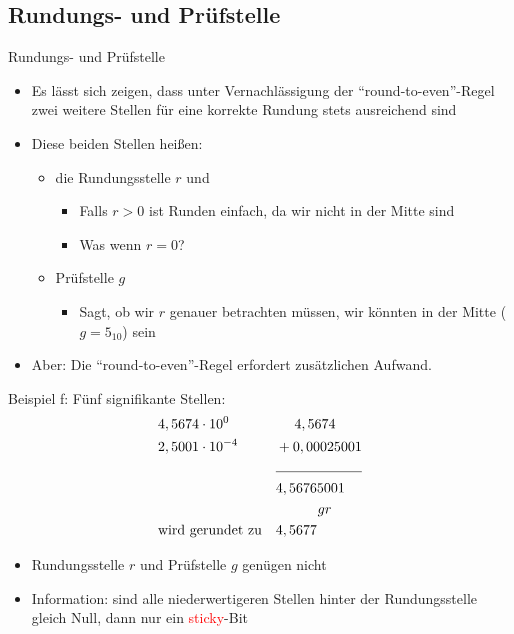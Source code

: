 \documentclass[12pt%
,xcolor=table
,aspectratio=169%
]{beamer}
\begin{document}
\subsection{Rundungs- und Prüfstelle}

\begin{frame}{Rundungs- und Prüfstelle}
\begin{itemize}
	\item Es lässt sich zeigen, dass unter Vernachlässigung der \enquote{round-to-even}-Regel zwei weitere Stellen für eine korrekte Rundung stets ausreichend sind
	\item Diese beiden Stellen heißen:
	\begin{itemize}
		\item die Rundungsstelle $r$ und
		\begin{itemize}
			\item Falls $r > 0$ ist Runden einfach, da wir nicht in der Mitte sind
			\item Was wenn $r=0$?
		\end{itemize}
		\item Prüfstelle $g$
		\begin{itemize}
			\item Sagt, ob wir $r$ genauer betrachten müssen, wir könnten in der Mitte ($g=5_{10}$) sein
		\end{itemize}
	\end{itemize}
	\item Aber: Die \enquote{round-to-even}-Regel erfordert zusätzlichen Aufwand.
\end{itemize}
\end{frame}

\begin{frame}{Beispiel f:}
Fünf signifikante Stellen:
\begin{align*}
	& 4,5674 \cdot 10^0 & & ~~~~4,5674 \\
	& 2,5001 \cdot 10^{-4} & & +0,00025001 \\ \cline{4-5} 
	& & & 4,56765001\\
	& & & ~~~~~~~~~gr \\
	& \text{wird gerundet zu} & & 4,5677
\end{align*}
\begin{itemize}
	\item Rundungsstelle $r$ und Prüfstelle $g$ genügen nicht
	\item Information: sind alle niederwertigeren Stellen hinter der Rundungsstelle gleich Null, dann nur ein \textcolor{red}{sticky}-Bit
\end{itemize}
\end{frame}
\end{document}
